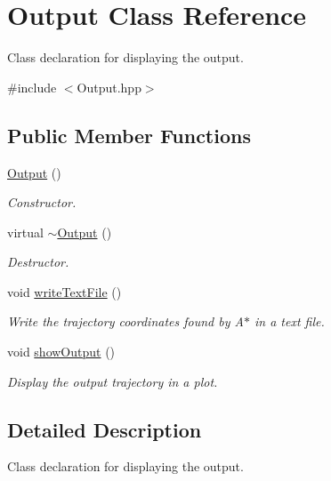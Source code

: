 \hypertarget{class_output}{}\section{Output Class Reference}
\label{class_output}


Class declaration for displaying the output.  




{\ttfamily \#include $<$Output.\+hpp$>$}

\subsection*{Public Member Functions}
\begin{DoxyCompactItemize}
\item 
\mbox{\label{class_output_a428c663520336477a12f1a33504eb067}} 
\mbox{\hyperlink{class_output_a428c663520336477a12f1a33504eb067}{Output}} ()
\begin{DoxyCompactList}\small\item\em Constructor. \end{DoxyCompactList}\item 
\mbox{\label{class_output_a61d0840daf98bea49e4dc471f235eeab}} 
virtual \mbox{\hyperlink{class_output_a61d0840daf98bea49e4dc471f235eeab}{$\sim$\+Output}} ()
\begin{DoxyCompactList}\small\item\em Destructor. \end{DoxyCompactList}\item 
void \mbox{\hyperlink{class_output_a50d6cb7aeb67ce25fc60df4475e171fa}{write\+Text\+File}} ()
\begin{DoxyCompactList}\small\item\em Write the trajectory coordinates found by A$\ast$ in a text file. \end{DoxyCompactList}\item 
void \mbox{\hyperlink{class_output_ade0ef9a04e645adedd3fcc82ac94f5ad}{show\+Output}} ()
\begin{DoxyCompactList}\small\item\em Display the output trajectory in a plot. \end{DoxyCompactList}\end{DoxyCompactItemize}


\subsection{Detailed Description}
Class declaration for displaying the output. 

